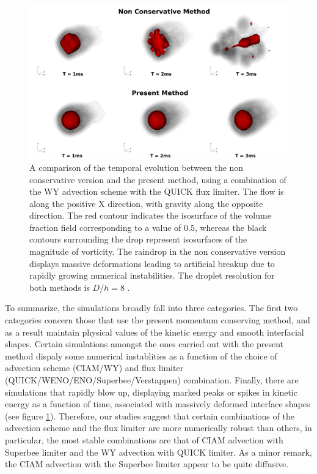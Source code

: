 \vspace*{0.2cm}

\begin{figure}[h!]
\begin{center}
\includegraphics[scale = 0.135]{Figures/Sagar/comparison.png}
\end{center}
\vspace*{-0.5cm}
\caption{A comparison of the temporal evolution between the non conservative version and the present method, using a combination of the WY advection scheme with the QUICK flux limiter. The flow is along the positive X direction, with gravity along the opposite direction. The red contour indicates the isosurface of the volume fraction field corresponding to a value of $0.5$, whereas the black contours surrounding the drop represent isosurfaces of the magnitude of vorticity. The raindrop in the non conservative version displays massive deformations leading to artificial breakup due to rapidly growing numerical instabilities. The droplet resolution for both methods is $D/h = 8$ .}
\label{compare}
\end{figure}

To summarize, the simulations broadly fall into three categories. The first two categories concern those that use the present momentum conserving method, and as a result maintain physical values of the kinetic energy and smooth interfacial shapes. Certain simulations amongst the ones carried out with the present method dispaly some numerical instablities as a function of the choice of advection scheme (CIAM/WY) and flux limiter (QUICK/WENO/ENO/Superbee/Verstappen) combination. Finally, there are simulations that rapidly blow up, displaying marked peaks or spikes in kinetic energy as a function of time, associated with massively deformed interface shapes (see figure \ref{compare}). Therefore, our studies suggest that certain combinations of the advection scheme and the flux limiter are more numerically robust than others, in particular, the most stable combinations are that of CIAM advection with Superbee limiter and the WY advection with QUICK limiter. As a minor remark, the CIAM advection with the Superbee limiter appear to be quite diffusive. 

